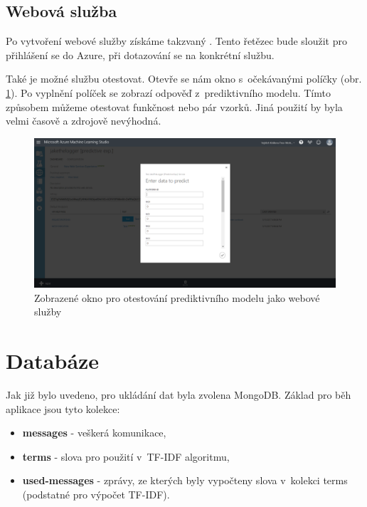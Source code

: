 \documentclass[thesis=M,czech]{FITthesis}[2012/10/20]
\begin{document}
		\subsection{Webová služba}
		  Po vytvoření webové služby získáme takzvaný . Tento řetězec bude sloužit pro přihlášení se do Azure, při dotazování se na konkrétní službu.
		  
		  Také je možné službu otestovat. Otevře se nám okno s~očekávanými políčky (obr. \ref{fig:azure_test_web_service}). Po vyplnění políček se zobrazí odpověď z~prediktivního modelu. Tímto způsobem můžeme otestovat funkčnost nebo pár vzorků. Jiná použití by byla velmi časově a zdrojově nevýhodná.
		  
		  \begin{figure}[htb]\centering
		  	\includegraphics[width=\textwidth]{./img/testPredictive}
		  	\caption{Zobrazené okno pro otestování prediktivního modelu jako webové služby}
		  	\label{fig:azure_test_web_service}
		  \end{figure}
	\section{Databáze}
	\label{sec:database}	
	Jak již bylo uvedeno, pro ukládání dat byla zvolena MongoDB. Základ pro běh aplikace jsou tyto kolekce:
		
	\begin{itemize} 
		\item \textbf{messages} - veškerá komunikace,
		\item \textbf{terms} - slova pro použití v~TF-IDF algoritmu,
		\item \textbf{used-messages} - zprávy, ze kterých byly vypočteny slova v~kolekci terms (podstatné pro výpočet TF-IDF).	
	\end{itemize} 
	
\end{document}

